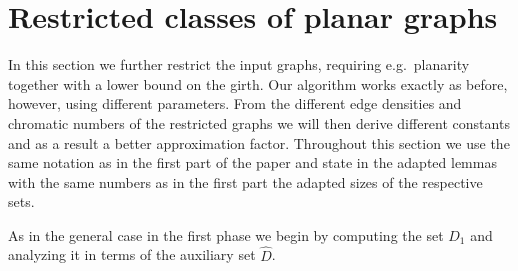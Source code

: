 

\section{Restricted classes of planar graphs}
In this section we further restrict the input graphs, requiring e.g.\ planarity
together with a lower bound on the girth. Our algorithm works exactly as before, however,
using different parameters. From the different edge densities and
chromatic numbers of
the restricted graphs we will then derive different constants and
as a result a better approximation factor. Throughout this section
we use the same notation as in the first part of the paper and state
in the adapted lemmas with the same numbers as in the first part
the adapted sizes of the respective sets.

As in the general case in the first phase we begin by computing
the set $D_1$ and analyzing it in terms of the auxiliary set $\hat{D}$.




%

